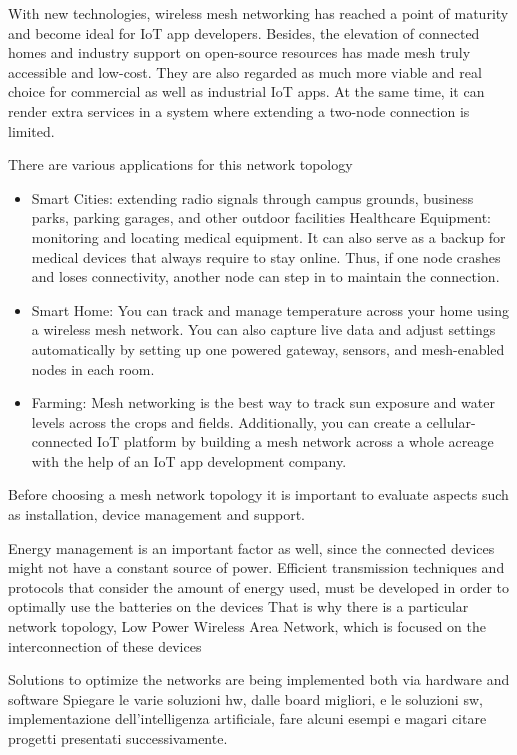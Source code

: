 		
		With new technologies, wireless mesh networking has reached a point of maturity and become ideal for IoT app developers. Besides, the elevation of connected homes and industry support on open-source resources has made mesh truly accessible and low-cost. They are also regarded as much more viable and real choice for commercial as well as industrial IoT apps. At the same time, it can render extra services in a system where extending a two-node connection is limited.
		
		There are various applications for this network topology
		\begin{itemize}[noitemsep]
			\item Smart Cities: extending radio signals through campus grounds, business parks, parking garages, and other outdoor facilities
			Healthcare Equipment: monitoring and locating medical equipment. It can also serve as a backup for medical devices that always require to stay online. Thus, if one node crashes and loses connectivity, another node can step in to maintain the connection.
			\item Smart Home: You can track and manage temperature across your home using a wireless mesh network. You can also capture live data and adjust settings automatically by setting up one powered gateway, sensors, and mesh-enabled nodes in each room.
			\item Farming: Mesh networking is the best way to track sun exposure and water levels across the crops and fields. Additionally, you can create a cellular-connected IoT platform by building a mesh network across a whole acreage with the help of an IoT app development company.
		\end{itemize}

		Before choosing a mesh network topology it is important to evaluate aspects such as installation, device management and support.
		
		Energy management is an important factor as well, since the connected devices might not have a constant source of power.		
		Efficient transmission techniques and protocols that consider the amount of energy used, must be developed in order to optimally use the batteries on the devices		
		That is why there is a particular network topology, Low Power Wireless Area Network, which is focused on the interconnection of these devices
		
		Solutions to optimize the networks are being implemented both via hardware and software
		Spiegare le varie soluzioni hw, dalle board migliori, e le soluzioni sw, implementazione dell'intelligenza artificiale, fare alcuni esempi e magari citare progetti presentati successivamente.
	
